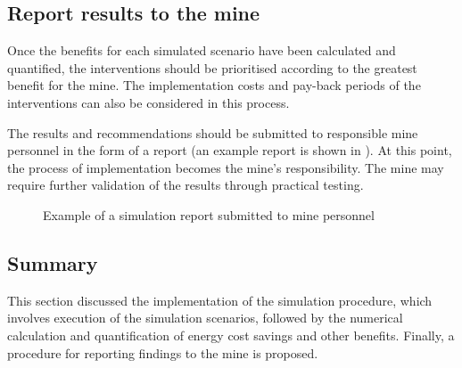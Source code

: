 		\subsection{Report results to the mine}
		Once the benefits for each simulated scenario have been calculated and quantified, the interventions should be prioritised according to the greatest benefit for the mine. The implementation costs and pay-back periods of the interventions can also be considered in this process.
		\par
		The results and recommendations should be submitted to responsible mine personnel in the form of a report (an example report is shown in ). At this point, the process of implementation becomes the mine's responsibility. The mine may require further validation of the results through practical testing.
		\clearpage
		\begin{figure}[h]
			\centering
			\caption{Example of a simulation report submitted to mine personnel}
			\label{fig: Report example}
		\end{figure}

	\subsection{Summary}
	This section discussed the implementation of the simulation procedure, which involves execution of the simulation scenarios, followed by the numerical calculation and quantification of energy cost savings and other benefits. Finally, a procedure for reporting findings to the mine is proposed.
